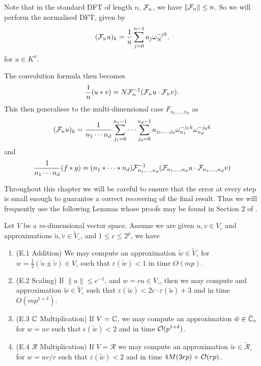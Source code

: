 Note that in the standard DFT of length $n$, $\mathcal F_n$, we have $\|\mathcal F_n\| \le n$. So we will perform the normalised DFT, given by
\[
    (\mathcal F_n u)_k = \frac{1}{n} \sum^{n-1}_{j=0} a_j \omega_N^{-jk}.
\]
for $u \in K^n$.

The convolution formula then becomes
\[
    \frac{1}{n} (u \ast v) = N\mathcal F_n^{-1} (\mathcal F_n u \cdot \mathcal F_n v).
\]
This then generalises to the multi-dimensional case $F_{n_1, \ldots, n_d}$ as
\[
    (\mathcal F_n u)_k = \frac{1}{n_1\cdots n_d} \sum^{n_1-1}_{j_1=0} \cdots \sum^{n_d-1}_{j_d=0} a_{j_1, \ldots, j_d} \omega_{n_1}^{-j_1 k} \omega_{n_d}^{-j_d k}
\]
and
\begin{equation}\label{eq:normalised-convolution}
    \frac{1}{n_1 \cdots n_d} (f \ast g) = (n_1 \ast \cdots \ast n_d)\mathcal F_{n_1, \ldots, n_d}^{-1} (\mathcal F_{n_1, \ldots, n_d} u \cdot \mathcal F_{n_1, \ldots, n_d} v)
\end{equation}

\medskip

Throughout this chapter we will be careful to ensure that the error at every step is small enough to guarantee a correct recovering of the final result. Thus we will frequently use the following Lemmas whose proofs may be found in Section 2 of \cite{nlogn}. 

\begin{proposition}
    Let $V$ be a $m$-dimensional vector space. Assume we are given $u, v \in V_\circ$ and approximations $\tilde{u}, \tilde{v} \in \tilde{V}_\circ$, and $1 \le c \le 2^p$, we have
    \begin{enumerate}
        \item (E.1 Addition) We may compute an approximation $\tilde{w} \in \tilde{V}_\circ$ for $w = \tfrac{1}{2}(\tilde{u} \pm \tilde{v}) \in V_\circ$ such that $\varepsilon(\tilde{w}) < 1$ in time $O(mp)$.
        \item (E.2 Scaling) If $\|u\| \le c^{-1}$, and $w = cu \in V_\circ$, then we may compute and approximation $\tilde{w} \in \tilde{V}_\circ$ such that $\varepsilon(\tilde{w}) < 2c \cdot \varepsilon(\tilde{u}) + 3$ and in time $O(mp^{1 + \delta})$.
        \item (E.3 ${\mathbb C}$ Multiplication) If $V = {\mathbb C}$, we may compute an approximation $\tilde{w} \in \tilde{{\mathbb C}}_\circ$ for $w = uv$ such that $\epsilon(\tilde{w}) < 2$ and in time $\mathcal O(p^{1 + \delta})$.
        \item (E.4 $\mathscr{R}$ Multiplication) If $V = \mathscr{R}$ we may compute an approximation $\tilde{w} \in \tilde{\mathscr{R}}_\circ$ for $w = uv/r$ such that $\varepsilon(\tilde{w}) < 2$ and in time $4M(3rp) + \mathcal O(rp)$.
    \end{enumerate}
\end{proposition}

